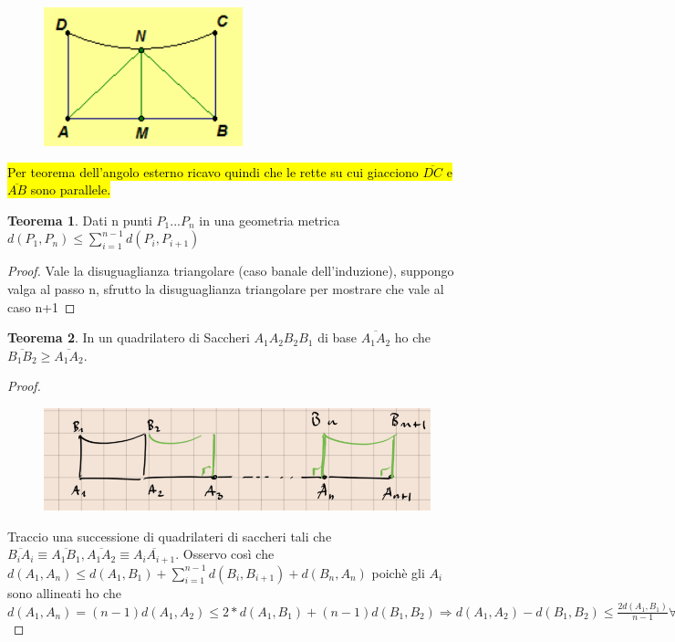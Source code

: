 \documentclass[a4paper,10pt]{article}
\theoremstyle{definition}
\theoremstyle{indentdefinition}
\theoremstyle{indentpostulate}
\theoremstyle{indenttheorem}
\newtheorem{thm}{Teorema}[section]
\theoremstyle{myremark}
\theoremstyle{indentgeneral}
\begin{document}
\begin{figure}[H]
    \centering
    \includegraphics[scale=0.5]{Saccheri.png}
\end{figure}

\hl{Per teorema dell'angolo esterno ricavo quindi che le rette su cui giacciono $\overline{DC}$ e $\overline{AB}$ sono parallele.}

\begin{thm} Dati n punti $P_1...P_n$ in una geometria metrica $d(P_1,P_n) \leq \sum_{i=1}^{n-1} d(P_i,P_{i+1})$     \end{thm} 

\begin{proof}  Vale la disuguaglianza triangolare (caso banale dell'induzione), suppongo valga al passo n, sfrutto la disuguaglianza triangolare per mostrare che vale al caso n+1    \end{proof} 

\begin{thm}  In un quadrilatero di Saccheri $A_1A_2B_2B_1$ di base $\overline{A_1A_2}$ ho che $\overline{B_1B_2} \geq \overline{A_1A_2}$.   \end{thm} 
\begin{proof}
\begin{figure}[H]
    \centering
    \includegraphics[width=0.3\linewidth]{Saccheri3.png}
\end{figure}
   Traccio una successione di quadrilateri di saccheri tali che   $\overline{B_iA_i}\equiv \overline{A_1B_1}, \overline{A_1A_2} \equiv \overline{A_iA_{i+1}}$. Osservo così che $d(A_1,A_n) \leq d(A_1,B_1)+\sum_{i=1}^{n-1}d(B_i,B_{i+1})+d(B_n,A_n)$ poichè gli $A_i$ sono allineati ho che $d(A_1,A_n)=(n-1)d(A_1,A_2) \leq 2*d(A_1,B_1)+(n-1)d(B_1,B_2) \Rightarrow d(A_1,A_2)-d(B_1,B_2) \leq \frac{2d(A_1,B_1)}{n-1} \forall n \in \mathbf{N} \Rightarrow d(B_1,B_2) \geq d(A_1,A_2)$ 
\end{proof}
\end{document}
